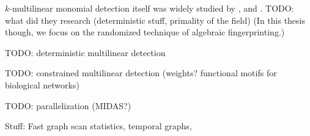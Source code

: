 $k$-multilinear monomial detection itself was widely studied by 
\citeauthor{Chen07} \cite{Chen07, Chen11a}, \citeauthor{Chen13a} \cite{Chen13a, Chen11b} 
and \citeauthor{Chen13b} \cite{Chen13b}. TODO: what did they research (deterministic stuff, primality of the field) 
(In this thesis though, we focus on the randomized technique of algebraic fingerprinting.)

TODO: deterministic multilinear detection

TODO: constrained multilinear detection (weights? functional motifs for biological networks)

TODO: parallelization (MIDAS?)

Stuff: Fast graph scan statistics, temporal graphs, 